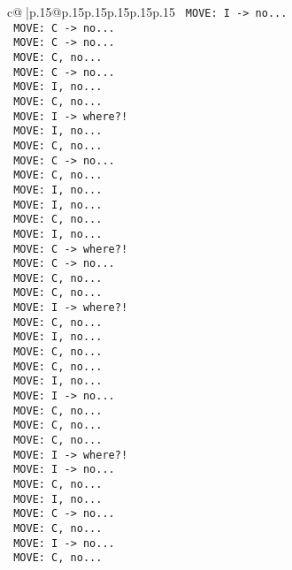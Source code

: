 \documentclass{article}
\begin{document}
{\begin{supertabular}{c@{$\;$}|p{.15\linewidth}@{}p{.15\linewidth}p{.15\linewidth}p{.15\linewidth}p{.15\linewidth}p{.15\linewidth}}
{{{\texttt{ MOVE: I {-}> no...} \\
\texttt{ MOVE: C {-}> no...} \\
\texttt{ MOVE: C {-}> no...} \\
\texttt{ MOVE: C, no...} \\
\texttt{ MOVE: C {-}> no...} \\
\texttt{ MOVE: I, no...} \\
\texttt{ MOVE: C, no...} \\
\texttt{ MOVE: I {-}> where?!} \\
\texttt{ MOVE: I, no...} \\
\texttt{ MOVE: C, no...} \\
\texttt{ MOVE: C {-}> no...} \\
\texttt{ MOVE: C, no...} \\
\texttt{ MOVE: I, no...} \\
\texttt{ MOVE: I, no...} \\
\texttt{ MOVE: C, no...} \\
\texttt{ MOVE: I, no...} \\
\texttt{ MOVE: C {-}> where?!} \\
\texttt{ MOVE: C {-}> no...} \\
\texttt{ MOVE: C, no...} \\
\texttt{ MOVE: C, no...} \\
\texttt{ MOVE: I {-}> where?!} \\
\texttt{ MOVE: C, no...} \\
\texttt{ MOVE: I, no...} \\
\texttt{ MOVE: C, no...} \\
\texttt{ MOVE: C, no...} \\
\texttt{ MOVE: I, no...} \\
\texttt{ MOVE: I {-}> no...} \\
\texttt{ MOVE: C, no...} \\
\texttt{ MOVE: C, no...} \\
\texttt{ MOVE: C, no...} \\
\texttt{ MOVE: I {-}> where?!} \\
\texttt{ MOVE: I {-}> no...} \\
\texttt{ MOVE: C, no...} \\
\texttt{ MOVE: I, no...} \\
\texttt{ MOVE: C {-}> no...} \\
\texttt{ MOVE: C, no...} \\
\texttt{ MOVE: I {-}> no...} \\
\texttt{ MOVE: C, no...} \\
}}}
\end{supertabular}}
\end{document}
